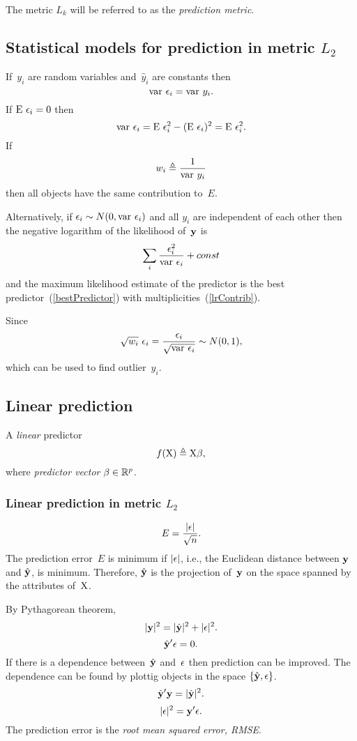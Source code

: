 \documentclass[10pt,a4paper]{article}
\theoremstyle{plain} \newtheorem{Lem}{Lemma}
\begin{document}
The metric $L_k$ will be referred to as the {\em prediction metric}.


\subsection{Statistical models for prediction in metric $L_2$}
If~$y_i$ are random variables and~$\hat y_i$ are constants then
$$ \mathrm {var} \  \epsilon_i = \mathrm {var} \  y_i. $$
If $\mathrm E \  \epsilon_i = 0$ then 
$$ \mathrm {var} \  \epsilon_i = \mathrm E \  \epsilon^2_i - (\mathrm E \  \epsilon_i)^2 = \mathrm E \  \epsilon^2_i. $$
If 
\begin{equation} \label{lrContrib}
w_i \triangleq \frac 1 {\mathrm {var} \  y_i}
\end{equation}
then all objects have the same contribution to~$E$.

Alternatively, 
if $\epsilon_i \sim N(0,\mathrm {var} \  \epsilon_i)$ and all $y_i$ are independent of each other
then the negative logarithm of the likelihood of~$\mathbf y$ is
$$ \sum_i \frac {\epsilon^2_i} {\mathrm {var} \  \epsilon_i} + const $$
and the maximum likelihood estimate of the predictor is the best predictor~(\ref{bestPredictor}) with multiplicities~(\ref{lrContrib}).

Since 
$$ \sqrt{w_i} \ \epsilon_i = \frac {\epsilon_i} {\sqrt {\mathrm {var} \  \epsilon_i}}  \sim N(0,1), $$
which can be used to find outlier~$y_i$.




\subsection {Linear prediction} \label{linearPrediction}
A {\em linear} predictor
$$ f(\mathrm X) \triangleq \mathrm X \mathbf \beta, $$
where {\em predictor vector} $\mathbf \beta \in \mathbb R^p$.


\subsubsection {Linear prediction in metric $L_2$} \label{linearPredictionL2}
$$ E = \frac {|\mathbf \epsilon|} {\sqrt{n}}. $$
The prediction error~$E$ is minimum if $|\mathbf \epsilon|$, i.e., the Euclidean distance between $\mathbf y$ and $\hat {\mathbf y}$, is minimum.
Therefore, $\hat {\mathbf y}$ is the projection of~$\mathbf y$ on the space spanned by the attributes of~$\mathrm X$.

By Pythagorean theorem,
$$ |\mathbf y|^2 = |\hat {\mathbf y}|^2 + |\mathbf \epsilon|^2. $$
$$ \hat {\mathbf y}' \mathbf \epsilon = 0. $$
If there is a dependence between~$\hat {\mathbf y}$ and~$\mathbf \epsilon$ then prediction can be improved.
The dependence can be found by plottig objects in the space $\{\hat {\mathbf y}, \mathbf \epsilon\}$.
$$ \hat {\mathbf y}' \mathbf y = |\hat {\mathbf y}|^2. $$
$$ |\mathbf \epsilon|^2 = \mathbf y' \mathbf \epsilon. $$
The prediction error is the {\em root mean squared error, RMSE}. 
\end{document}
